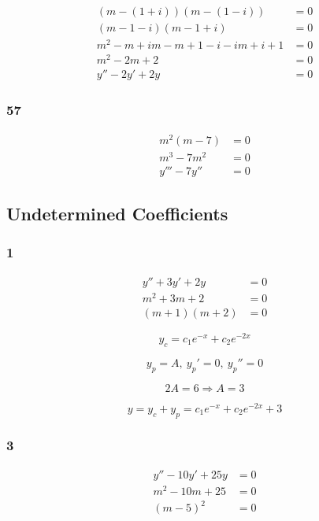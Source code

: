 \documentclass{article}
\begin{document}
\begin{align*}
  (m - (1 + i)) (m - (1 - i))           & = 0 \\
  (m - 1 - i) (m - 1 + i)               & = 0 \\
  m^2 - m + im - m + 1 - i - im + i + 1 & = 0 \\
  m^2 - 2m + 2                          & = 0 \\
  y'' - 2y' + 2y                        & = 0
\end{align*}

\subsubsection{57}

\begin{align*}
  m^2 (m - 7) & = 0 \\
  m^3 - 7m^2  & = 0 \\
  y''' - 7y'' & = 0
\end{align*}

\subsection{Undetermined Coefficients}

\subsubsection{1}

\begin{align*}
  y'' + 3y' + 2y & = 0 \\
  m^2 + 3m + 2   & = 0 \\
  (m + 1)(m + 2) & = 0
\end{align*}

\[y_c = c_1 e^{-x} + c_2 e^{-2x}\]

\[y_p = A, \:y_p' = 0, \:y_p'' = 0\]

\[2A = 6 \Rightarrow A = 3\]

\[y = y_c + y_p = c_1 e^{-x} + c_2 e^{-2x} + 3\]

\subsubsection{3}

\begin{align*}
  y'' - 10y' + 25y & = 0 \\
  m^2 - 10m + 25   & = 0 \\
  (m - 5)^2        & = 0
\end{align*}
\end{document}
